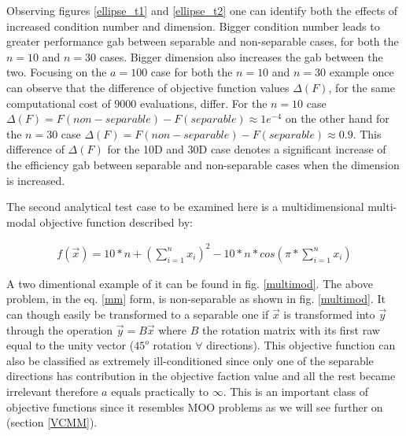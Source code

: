 Observing figures \ref{ellipse_t1} and \ref{ellipse_t2} one can identify both the effects of increased condition number and dimension. Bigger condition number leads to greater performance gab between separable and non-separable cases, for both the $n=10$ and $n=30$ cases. Bigger dimension also increases the gab between the two. Focusing on the $a=100$ case for both the $n=10$ and $n=30$ example once can observe that the difference of objective function values $\Delta(F)$, for the same computational cost of $9000$ evaluations, differ. For the $n=10$ case $\Delta(F)=F(non-separable)-F(separable) \approx  1e^{-4}$ on the other hand for the $n=30$ case $\Delta(F)=F(non-separable)-F(separable) \approx  0.9$. This difference of $\Delta(F)$ for the 10D and 30D case denotes a significant increase of the efficiency gab between separable and non-separable cases when the dimension is increased.      

The second analytical test case to be examined here is a multidimensional multi-modal objective function described by:  

\begin{eqnarray}
   f(\vec{x})=10*n+(\sum^{n}_{i=1}x_i)^2 - 10*n*cos(\pi * \sum^{n}_{i=1}x_i)
   \label{mm} 
\end{eqnarray}

A two dimentional example of it can be found in fig. \ref{multimod}. The above problem, in the eq. \ref{mm} form, is non-separable as shown in fig. \ref{multimod}. It can though easily be transformed to a separable one if $\vec{x}$ is transformed into $\vec{y}$ through the operation $\vec{y}=B\vec{x}$ where $B$ the rotation matrix with its first raw equal to the unity vector ($45^o$ rotation $\forall$ directions).  This objective function can also be classified as extremely ill-conditioned since only one of the separable directions has contribution in the objective faction value and all the rest became irrelevant therefore $a$ equals practically to $\infty$. This is an important class of objective functions since it resembles MOO problems as we will see further on (section \ref{VCMM}).    

